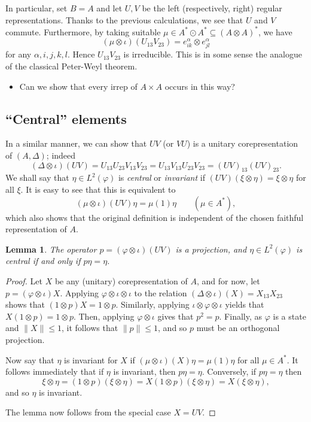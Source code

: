 \documentclass[twoside,a4paper,12pt]{article}
\theoremstyle{plain}
\newtheorem{lemma}[proposition]{Lemma}
\theoremstyle{definition}
\begin{document}
In particular, set $B=A$ and let $U,V$ be the left (respectively, right) regular
representations.  Thanks to the previous calculations, we see that $U$ and $V$
commute.  Furthermore, by taking suitable $\mu\in A^*\odot A^* \subseteq
(A\otimes A)^*$, we have
\[ (\mu\otimes\iota)(U_{13} V_{23}) = e^\alpha_{ik}\otimes e^\alpha_{jl} \]
for any $\alpha,i,j,k,l$.  Hence $U_{13} V_{23}$ is irreducible.  This is in
some sense the analogue of the classical Peter-Weyl theorem.

\begin{itemize}
\item Can we show that every irrep of $A\times A$ occurs in this way?
\end{itemize}


\subsection{``Central'' elements}

In a similar manner, we can show that $UV$ (or $VU$) is a unitary
corepresentation of $(A,\Delta)$; indeed
\[ (\Delta\otimes\iota)(UV) = U_{13} U_{23} V_{13} V_{23}
= U_{13} V_{13} U_{23} V_{23} = (UV)_{13} (UV)_{23}. \]
We shall say that $\eta\in L^2(\varphi)$ is \emph{central} or \emph{invariant}
if $(UV)(\xi\otimes\eta)=\xi\otimes\eta$ for all $\xi$.  It is easy to
see that this is equivalent to
\[ (\mu\otimes\iota)(UV) \eta = \mu(1) \eta
\qquad (\mu\in A^*), \]
which also shows that the original definition is independent of the chosen
faithful representation of $A$.

\begin{lemma}
The operator $p=(\varphi\otimes\iota)(UV)$ is a projection, and $\eta\in
L^2(\varphi)$ is central if and only if $p\eta=\eta$.
\end{lemma}
\begin{proof}
Let $X$ be any (unitary) corepresentation of $A$, and for now, let
$p=(\varphi\otimes\iota)X$.
Applying $\varphi\otimes\iota\otimes\iota$ to the relation
$(\Delta\otimes\iota)(X) = X_{13} X_{23}$ shows that $(1\otimes p)X =
1\otimes p$.  Similarly, applying $\iota\otimes\varphi\otimes\iota$ yields
that $X(1\otimes p) = 1\otimes p$.  Then, applying $\varphi\otimes\iota$
gives that $p^2=p$.  Finally, as $\varphi$ is a state and $\|X\|\leq 1$,
it follows that $\|p\|\leq 1$, and so $p$ must be an orthogonal projection.

Now say that $\eta$ is invariant for $X$ if $(\mu\otimes\iota)(X) \eta
= \mu(1) \eta$ for all $\mu\in A^*$.  It follows immediately that if
$\eta$ is invariant, then $p\eta=\eta$.  Conversely, if $p\eta=\eta$ then
\[ \xi\otimes \eta = (1\otimes p)(\xi\otimes\eta) = X
(1\otimes p)(\xi\otimes\eta) = X(\xi\otimes\eta), \]
and so $\eta$ is invariant.

The lemma now follows from the special case $X=UV$.
\end{proof}
\end{document}
